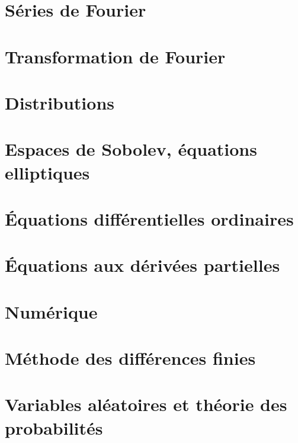 \documentclass[a4paper,twoside,11pt]{book}
\begin{document}
\chapter{Séries de Fourier}


\chapter{Transformation de Fourier}


\chapter{Distributions}


\chapter{Espaces de Sobolev, équations elliptiques}      \label{CHAPooVTIIooGOEvXT}


\chapter{Équations différentielles ordinaires}





\chapter{Équations aux dérivées partielles}


\chapter{Numérique}





\chapter{Méthode des différences finies}




\chapter{Variables aléatoires et théorie des probabilités}




\end{document}
